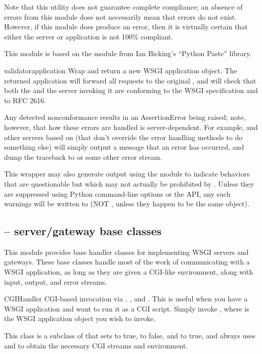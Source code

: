 Note that this utility does not guarantee complete  compliance;
an absence of errors from this module does not necessarily mean that
errors do not exist.  However, if this module does produce an error,
then it is virtually certain that either the server or application is
not 100\% compliant.

This module is based on the  module from Ian
Bicking's ``Python Paste'' library.

\begin{funcdesc}{validator}{application}
Wrap  and return a new WSGI application object.  The
returned application will forward all requests to the original
, and will check that both the  and
the server invoking it are conforming to the WSGI specification and to
RFC 2616.

Any detected nonconformance results in an AssertionError being raised;
note, however, that how these errors are handled is server-dependent.
For example,  and other servers based on
 (that don't override the error handling
methods to do something else) will simply output a message that an error
has occurred, and dump the traceback to  or some other
error stream.

This wrapper may also generate output using the  module
to indicate behaviors that are questionable but which may not actually
be prohibited by .  Unless they are suppressed using Python
command-line options or the  API, any such warnings
will be written to  (NOT , unless
they happen to be the same object).
\end{funcdesc}

\subsection{ -- server/gateway base classes}

This module provides base handler classes for implementing WSGI servers
and gateways.  These base classes handle most of the work of
communicating with a WSGI application, as long as they are given a
CGI-like environment, along with input, output, and error streams.


\begin{classdesc}{CGIHandler}{}
CGI-based invocation via , ,
 and .  This is useful when you have
a WSGI application and want to run it as a CGI script.  Simply invoke
, where  is the WSGI application
object you wish to invoke.

This class is a subclass of  that sets
 to true,  to false, and
 to true, and always uses  and
 to obtain the necessary CGI streams and environment.
\end{classdesc}


